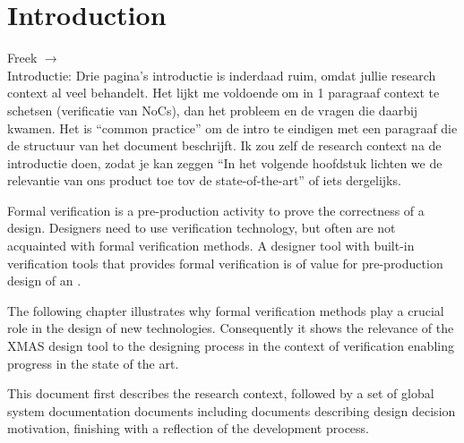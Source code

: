 \chapter*{Introduction}
\begin{tcolorbox}[colback=yellow!30]
Freek $\rightarrow$ \\ 
Introductie: Drie pagina's introductie is inderdaad ruim, omdat jullie research context al veel behandelt. Het lijkt me voldoende om in 1 paragraaf context te schetsen (verificatie van NoCs), dan het probleem en de vragen die daarbij kwamen. Het is ``common practice'' om de intro te eindigen met een paragraaf die de structuur van het document beschrijft. Ik zou zelf de research context na de introductie doen, zodat je kan zeggen ``In het volgende hoofdstuk lichten we de relevantie van ons product toe tov de state-of-the-art'' of iets dergelijks.

\end{tcolorbox}

Formal verification is a pre-production activity to prove the correctness of a 
design. Designers need to use verification technology, but often are not 
acquainted with formal verification methods. A designer tool with built-in 
verification tools that provides formal verification is of value for pre-production
design of an \Noc. 

The following chapter illustrates why formal verification methods play a crucial 
role in the design of new technologies. Consequently it shows the relevance of the
XMAS design tool to the designing process in the context of verification enabling 
progress in the state of the art.

This document first describes the research context, followed by a set of global system 
documentation documents including documents describing design decision motivation, finishing
with a reflection of the development process.

